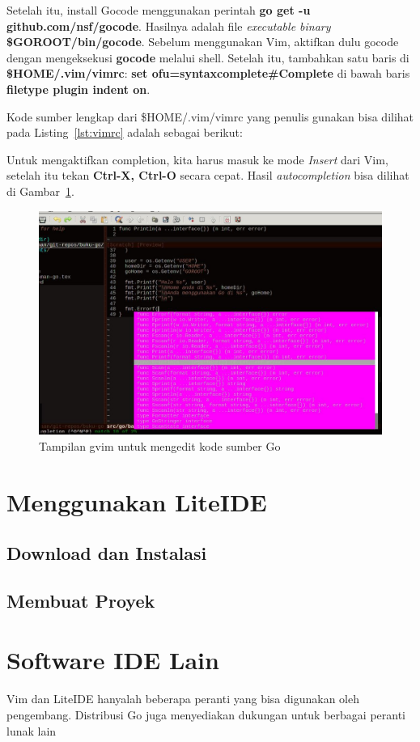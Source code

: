 Setelah itu, install Gocode menggunakan perintah \textbf{go get -u github.com/nsf/gocode}. Hasilnya adalah file \textit{executable binary} \textbf{\$GOROOT/bin/gocode}. Sebelum menggunakan Vim, aktifkan dulu gocode dengan mengeksekusi \textbf{gocode} melalui shell. Setelah itu, tambahkan satu baris di \textbf{\$HOME/.vim/vimrc}: \textbf{set ofu=syntaxcomplete\#Complete} di bawah baris \textbf{filetype plugin indent on}.

Kode sumber lengkap dari \$HOME/.vim/vimrc yang penulis gunakan bisa dilihat pada Listing~\ref{lst:vimrc} adalah sebagai berikut:



Untuk mengaktifkan completion, kita harus masuk ke mode \textit{Insert} dari Vim, setelah itu tekan \textbf{Ctrl-X, Ctrl-O} secara cepat. Hasil \textit{autocompletion} bisa dilihat di Gambar~\ref{fig:vim-go-completion}.

  \begin{figure}
    \begin{center}
      \includegraphics[scale=0.5]{images/vim-go-completion.jpg}
    \end{center}
    \caption{Tampilan gvim untuk mengedit kode sumber Go}
    \label{fig:vim-go-completion}
  \end{figure}

\section{Menggunakan LiteIDE}

\subsection{Download dan Instalasi}


\subsection{Membuat Proyek}


\section{Software IDE Lain}

Vim dan LiteIDE hanyalah beberapa peranti yang bisa digunakan oleh pengembang. Distribusi Go juga menyediakan dukungan untuk berbagai peranti lunak lain
